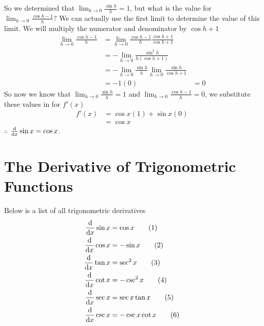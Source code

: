\documentclass[working]{tuftebook}
\begin{document}
\begin{myproof}
So we determined that $ \lim_{h\to 0} \frac{ \sin h}{h}=1$, but what is the value for $ \lim_{h\to 0} \frac{ \cos h-1}{h}$? We can actually use the first limit to determine the value of this limit. We will multiply the numerator and denominator by $ \cos h+1$
\begin{align*}
    \lim_{h\to 0} \frac{ \cos h-1}{h}&=\lim_{h\to 0} \frac{ \cos h-1}{h} \frac{ \cos h+1}{ \cos h+1}\\ 
                                     &=- \lim_{h\to 0}\frac{ \sin ^2h}{h( \cos h+1)}\\ 
                                     &=- \lim_{h\to 0} \frac{ \sin h}{h}\lim_{h\to 0} \frac{ \sin h}{ \cos h+1}\\
                                     &=-1(0)
                                     &=0
\end{align*}
So now we know that $ \lim_{h\to 0} \frac{ \sin h}{h}=1$ and $ \lim_{h\to 0} \frac{ \cos h-1}{h}=0$, we substitute these values in for $f'(x)$ 
\begin{align*}
    f'(x)&= \cos x (1)+ \sin x(0)\\ 
         &= \cos x
\end{align*}
$\therefore$ $ \dv{}{x} \sin x= \cos x$.
\end{myproof}

\section{The Derivative of Trigonometric Functions}
\vspace{1em}
\begin{theorem} Below is a list of all trigonometric derivatives
    \begin{align*}
        \dv{}{x} \sin x&= \cos x\tag{1}\\
        \dv{}{x} \cos x&=- \sin x\tag{2}\\ 
        \dv{}{x} \tan x&= \sec ^2x\tag{3}\\ 
        \dv{}{x} \cot x&= - \csc ^2x\tag{4}\\ 
        \dv{}{x} \sec x&= \sec x \tan x\tag{5}\\ 
        \dv{}{x} \csc  x&= - \csc x \cot  x\tag{6}
    \end{align*}
\end{theorem}
\end{document}
